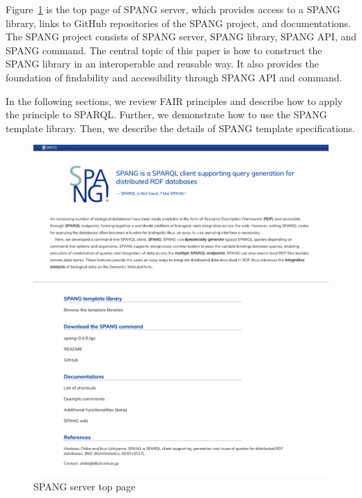 \documentclass[runningheads]{llncs}
\begin{document}
Figure~\ref{fig:spang_top} is the top page of SPANG server, which provides access to a SPANG library, links to GitHub repositories of the SPANG project, and documentations. The SPANG project consists of SPANG server, SPANG library, SPANG API, and SPANG command. The central topic of this paper is how to construct the SPANG library in an interoperable and reusable way. It also provides the foundation of findability and accessibility through SPANG API and command.

In the following sections, we review FAIR principles and describe how to apply the principle to SPARQL.
Further, we demonstrate how to use the SPANG template library.
Then, we describe the details of SPANG template specifications.


\begin{figure}
\center
\includegraphics[width=1.0\textwidth]{spang_top.png}
\caption{SPANG server top page}
\label{fig:spang_top}
\end{figure}
\end{document}
